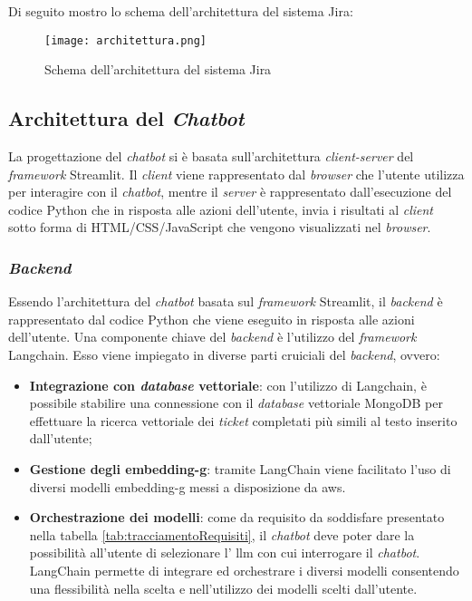 \noindent
Di seguito mostro lo schema dell'architettura del sistema Jira:
\begin{figure}[H]
    \centering
    \texttt{[image: architettura.png]}
    \caption{Schema dell'architettura del sistema Jira}
    \label{fig:architetturaJira}
\end{figure}

\subsection{Architettura del \textit{Chatbot}}
La progettazione del \textit{chatbot} si è basata sull'architettura \textit{client-server} del \textit{framework} Streamlit. Il \textit{client} viene rappresentato dal \textit{browser} che l'utente utilizza per interagire con il \textit{chatbot}, mentre il \textit{server} è rappresentato dall'esecuzione del codice Python che in risposta alle azioni dell'utente, invia i risultati al \textit{client} sotto forma di HTML/CSS/JavaScript che vengono visualizzati nel \textit{browser}.
\subsubsection{\textit{Backend}}
Essendo l'architettura del \textit{chatbot} basata sul \textit{framework} Streamlit, il \textit{backend} è rappresentato dal codice Python che viene eseguito in risposta alle azioni dell'utente.
Una componente chiave del \textit{backend} è l'utilizzo del \textit{framework} Langchain. Esso viene impiegato in diverse parti cruiciali del \textit{backend}, ovvero:
\begin{itemize}
    \item \textbf{Integrazione con \textit{database} vettoriale}: con l'utilizzo di Langchain, è possibile stabilire una connessione con il \textit{database} vettoriale MongoDB per effettuare la ricerca vettoriale dei \textit{ticket} completati più simili al testo inserito dall'utente;
    \item \textbf{Gestione degli \gls{embedding-g}}: tramite LangChain viene facilitato l'uso di diversi modelli \gls{embedding-g} messi a disposizione da \gls{aws}. 
    \item \textbf{Orchestrazione dei modelli}: come da requisito da soddisfare presentato nella tabella \ref{tab:tracciamentoRequisiti}, il \textit{chatbot} deve poter dare la possibilità all'utente di selezionare l' \gls{llm} con cui interrogare il \textit{chatbot}. LangChain permette di integrare ed orchestrare i diversi modelli consentendo una flessibilità nella scelta e nell'utilizzo dei modelli scelti dall'utente.
\end{itemize} 

